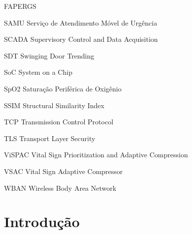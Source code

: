 \documentclass[twoside,english,brazilian]{UNISINOSmonografia}
\begin{document}
\begin{listadesiglas}{FAPERGS}
\item[SAMU] Serviço de Atendimento Móvel de Urgência
\item[SCADA] Supervisory Control and Data Acquisition
\item[SDT] Swinging Door Trending
\item[SoC] System on a Chip
\item[SpO2] Saturação Periférica de Oxigênio
\item[SSIM] Structural Similarity Index
\item[TCP] Transmission Control Protocol
\item[TLS] Transport Layer Security
\item[ViSPAC] Vital Sign Prioritization and Adaptive Compression
\item[VSAC] Vital Sign Adaptive Compressor
\item[WBAN] Wireless Body Area Network
\end{listadesiglas}

\tableofcontents

\chapter{Introdução}
\label{intro}
\end{document}
